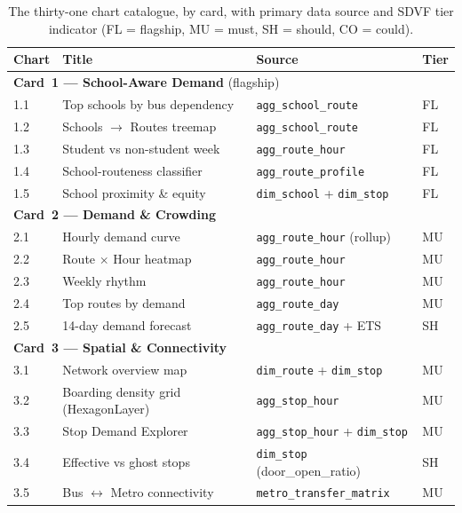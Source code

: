 \begin{table}[H]
\centering
\caption{The thirty-one chart catalogue, by card, with primary
data source and SDVF tier indicator (FL = flagship, MU = must,
SH = should, CO = could).}
\label{tab:proposed:chart_aggregate}
\footnotesize
\renewcommand{\arraystretch}{1.15}
\begin{tabularx}{\linewidth}{p{0.9cm}Xp{4.2cm}p{1.0cm}}
\hline
\textbf{Chart} & \textbf{Title} & \textbf{Source} & \textbf{Tier} \\
\hline
\multicolumn{4}{l}{\textbf{Card~1 --- School-Aware Demand} (flagship)} \\
\hline
1.1 & Top schools by bus dependency & \texttt{agg\_school\_route} & FL \\
1.2 & Schools $\rightarrow$ Routes treemap & \texttt{agg\_school\_route} & FL \\
1.3 & Student vs non-student week & \texttt{agg\_route\_hour} & FL \\
1.4 & School-routeness classifier & \texttt{agg\_route\_profile} & FL \\
1.5 & School proximity \& equity & \texttt{dim\_school} + \texttt{dim\_stop} & FL \\
\hline
\multicolumn{4}{l}{\textbf{Card~2 --- Demand \& Crowding}} \\
\hline
2.1 & Hourly demand curve & \texttt{agg\_route\_hour} (rollup) & MU \\
2.2 & Route $\times$ Hour heatmap & \texttt{agg\_route\_hour} & MU \\
2.3 & Weekly rhythm & \texttt{agg\_route\_hour} & MU \\
2.4 & Top routes by demand & \texttt{agg\_route\_day} & MU \\
2.5 & 14-day demand forecast & \texttt{agg\_route\_day} + ETS & SH \\
\hline
\multicolumn{4}{l}{\textbf{Card~3 --- Spatial \& Connectivity}} \\
\hline
3.1 & Network overview map & \texttt{dim\_route} + \texttt{dim\_stop} & MU \\
3.2 & Boarding density grid (HexagonLayer) & \texttt{agg\_stop\_hour} & MU \\
3.3 & Stop Demand Explorer & \texttt{agg\_stop\_hour} + \texttt{dim\_stop} & MU \\
3.4 & Effective vs ghost stops & \texttt{dim\_stop} (door\_open\_ratio) & SH \\
3.5 & Bus $\leftrightarrow$ Metro connectivity & \texttt{metro\_transfer\_matrix} & MU \\

\end{tabularx}
\end{table}
